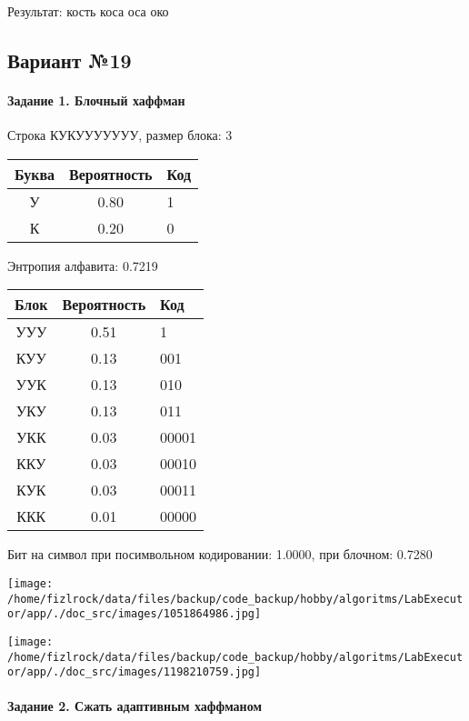 \documentclass[a4paper, 12pt]{article}
\begin{document}
Результат: кость коса оса око
\pagebreak
\subsection{Вариант №19}
\paragraph{Задание 1. Блочный хаффман \\}

Строка КУКУУУУУУУ, размер блока: 3
\begin{center}
 \begin{tabular}{ |c|c|l| } 
  \hline
     Буква & Вероятность & Код\\ \hline
У & 0.80 & 1\\\hline
К & 0.20 & 0
\\ \hline \end{tabular}
\end{center}
Энтропия алфавита: 0.7219
\begin{center}
 \begin{tabular}{ |c|c|l| } 
  \hline
     Блок & Вероятность & Код\\ \hline
УУУ & 0.51 & 1\\\hline
КУУ & 0.13 & 001\\\hline
УУК & 0.13 & 010\\\hline
УКУ & 0.13 & 011\\\hline
УКК & 0.03 & 00001\\\hline
ККУ & 0.03 & 00010\\\hline
КУК & 0.03 & 00011\\\hline
ККК & 0.01 & 00000
\\ \hline \end{tabular}
\end{center}
Бит на символ при посимвольном кодировании: 1.0000, при блочном: 0.7280

\texttt{[image: /home/fizlrock/data/files/backup/code\_backup/hobby/algoritms/LabExecutor/app/./doc\_src/images/1051864986.jpg]}

\texttt{[image: /home/fizlrock/data/files/backup/code\_backup/hobby/algoritms/LabExecutor/app/./doc\_src/images/1198210759.jpg]}
\pagebreak
\paragraph{Задание 2. Сжать адаптивным хаффманом\\}
\end{document}
